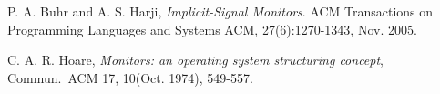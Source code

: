 \documentclass[10pt, conference, compsocconf]{IEEEtran}
\begin{document}

%
%
%
\begin{thebibliography}{1}
  P. A. Buhr and A. S. Harji, \emph{Implicit-Signal Monitors}. ACM 
  Transactions on Programming Languages and Systems ACM, 27(6):1270-1343, 
  Nov. 2005.

  C. A. R. Hoare, \emph{Monitors: an operating system structuring concept}, 
  Commun.~ACM 17, 10(Oct. 1974), 549-557.

\end{thebibliography}




\end{document}
